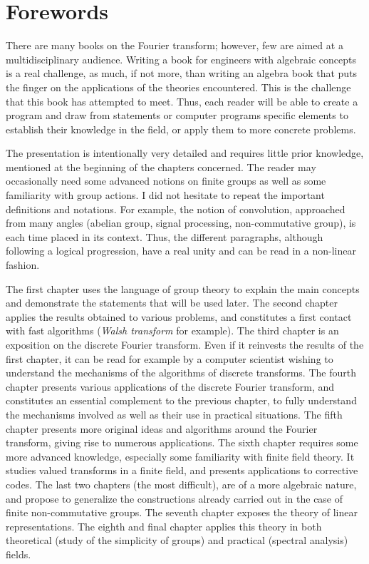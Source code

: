 \chapter*{Forewords}

There are many books on the Fourier transform; however, few are aimed at a multidisciplinary audience. Writing a book for engineers with algebraic concepts is a real challenge, as much, if not more, than writing an algebra book that puts the finger on the applications of the theories encountered. This is the challenge that this book has attempted to meet. Thus, each reader will be able to create a  program and draw from statements or computer programs specific elements to establish their knowledge in the field, or apply them to more concrete problems.

The presentation is intentionally very detailed and requires little prior knowledge, mentioned at the beginning of the chapters concerned. 
The reader may occasionally need some advanced notions on finite groups as well as some familiarity with group actions. %
I did not hesitate to repeat the important definitions and notations. For example, the notion of convolution, approached from many angles (abelian group, signal processing, non-commutative group), is each time placed in its context. Thus, the different paragraphs, although following a logical progression, have a real unity and can be read in a non-linear fashion.

The first chapter uses the language of group theory to explain the main concepts and demonstrate the statements that will be used later. The second chapter applies the results obtained to various problems, and constitutes a first contact with fast algorithms (\textit{Walsh transform} for example). The third chapter is an exposition on the discrete Fourier transform. Even if it reinvests the results of the first chapter, it can be read for example by a computer scientist wishing to understand the mechanisms of the algorithms of discrete transforms. The fourth chapter presents various applications of the discrete Fourier transform, and constitutes an essential complement to the previous chapter, to fully understand the mechanisms involved as well as their use in practical situations. The fifth chapter presents more original ideas and algorithms around the Fourier transform, giving rise to numerous applications. The sixth chapter requires some more advanced knowledge, especially some familiarity with finite field theory. It studies valued transforms in a finite field, and presents applications to corrective codes. The last two chapters (the most difficult), are of a more algebraic nature, and propose to generalize the constructions already carried out in the case of finite non-commutative groups. The seventh chapter exposes the theory of linear representations. The eighth and final chapter applies this theory in both theoretical (study of the simplicity of groups) and practical (spectral analysis) fields.

